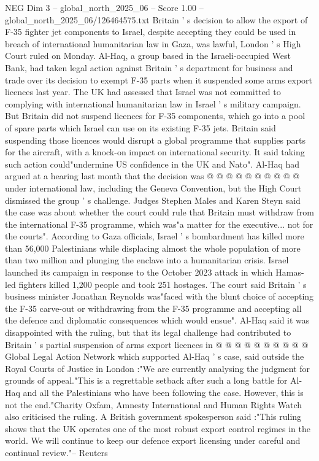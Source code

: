 \begin{textsample}{NEG Dim 3 – global\_north\_2025\_06 – Score 1.00 – global\_north\_2025\_06/126464575.txt}  \label{ex:f3_neg_364}
Britain ' s decision to allow the export of F-35 fighter jet components to Israel, despite accepting they could be used in breach of international humanitarian law in Gaza, was lawful, London ' s High Court ruled on Monday.
Al-Haq, a group based in the Israeli-occupied West Bank, had taken legal action against Britain ' s department for business and trade over its decision to exempt F-35 parts when it suspended some arms export licences last year.
The UK had assessed that Israel was not committed to complying with international humanitarian law in Israel ' s military campaign.
But Britain did not suspend licences for F-35 components, which go into a pool of spare parts which Israel can use on its existing F-35 jets.
Britain said suspending those licences would disrupt a global programme that supplies parts for the aircraft, with a knock-on impact on international security.
It said taking such action could"undermine US confidence in the UK and Nato".
Al-Haq had argued at a hearing last month that the decision was @ @ @ @ @ @ @ @ @ @ under international law, including the Geneva Convention, but the High Court dismissed the group ' s challenge.
Judges Stephen Males and Karen Steyn said the case was about whether the court could rule that Britain must withdraw from the international F-35 programme, which was"a matter for the executive... not for the courts".
According to Gaza officials, Israel ' s bombardment has killed more than 56,000 Palestinians while displacing almost the whole population of more than two million and plunging the enclave into a humanitarian crisis.
Israel launched its campaign in response to the October 2023 attack in which Hamas-led fighters killed 1,200 people and took 251 hostages.
The court said Britain ' s business minister Jonathan Reynolds was"faced with the blunt choice of accepting the F-35 carve-out or withdrawing from the F-35 programme and accepting all the defence and diplomatic consequences which would ensue".
Al-Haq said it was disappointed with the ruling, but that its legal challenge had contributed to Britain ' s partial suspension of arms export licences in @ @ @ @ @ @ @ @ @ @ Global Legal Action Network which supported Al-Haq ' s case, said outside the Royal Courts of Justice in London :"We are currently analysing the judgment for grounds of appeal."This is a regrettable setback after such a long battle for Al-Haq and all the Palestinians who have been following the case.
However, this is not the end."Charity Oxfam, Amnesty International and Human Rights Watch also criticised the ruling.
A British government spokesperson said :"This ruling shows that the UK operates one of the most robust export control regimes in the world.
We will continue to keep our defence export licensing under careful and continual review."-- Reuters

\end{textsample}
